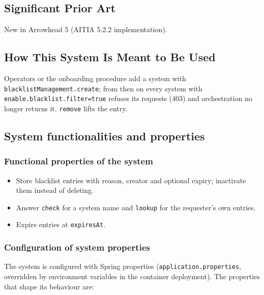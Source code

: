 \documentclass[a4paper]{arrowhead}
\begin{document}
\newpage

\subsection{Significant Prior Art}
\label{sec:prior_art}

New in Arrowhead 5 (AITIA 5.2.2 implementation).

\subsection{How This System Is Meant to Be Used}
\label{sec:use}

Operators or the onboarding procedure add a system with \texttt{blacklist\allowbreak{}Management.\allowbreak{}create}; from then on every system with \texttt{enable.\allowbreak{}blacklist.\allowbreak{}filter=\allowbreak{}true} refuses its requests (403) and orchestration no longer returns it. \texttt{remove} lifts the entry.

\subsection{System functionalities and properties}
\label{sec:properties}

\subsubsection{Functional properties of the system}

\begin{itemize}
  \item Store blacklist entries with reason, creator and optional expiry; inactivate them instead of deleting.
  \item Answer \texttt{check} for a system name and \texttt{lookup} for the requester's own entries.
  \item Expire entries at \texttt{expiresAt}.
\end{itemize}

\subsubsection{Configuration of system properties}

The system is configured with Spring properties (\texttt{application.properties}, overridden by environment variables in the container deployment). The properties that shape its behaviour are:
\end{document}

